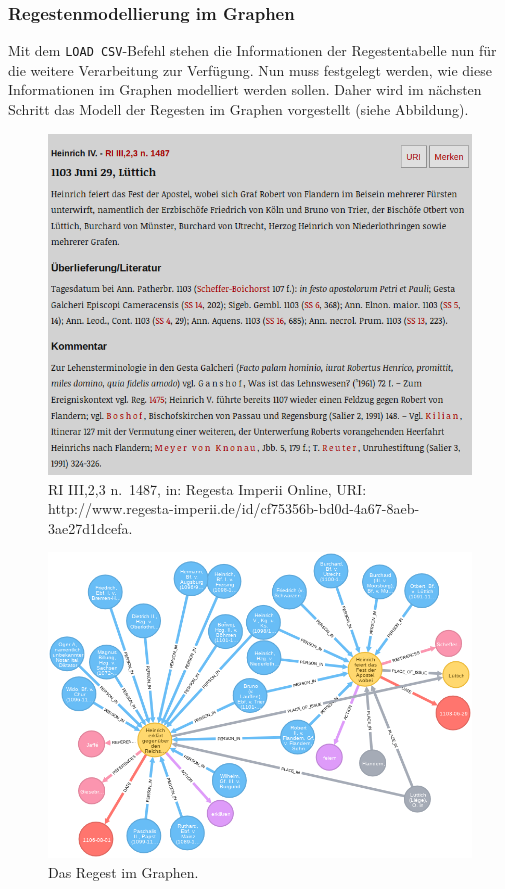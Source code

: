 \hypertarget{regestenmodellierung-im-graphen-1}{%
\subsubsection{Regestenmodellierung im
Graphen}\label{regestenmodellierung-im-graphen-1}}

Mit dem \texttt{LOAD\ CSV}-Befehl stehen die Informationen der
Regestentabelle nun für die weitere Verarbeitung zur Verfügung. Nun muss
festgelegt werden, wie diese Informationen im Graphen modelliert werden
sollen. Daher wird im nächsten Schritt das Modell der Regesten im
Graphen vorgestellt (siehe Abbildung).

\begin{figure}
\centering
\includegraphics{Bilder/RI2Graph/ReggH4-Nr-1487.png}
\caption{RI III,2,3 n.~1487, in: Regesta Imperii Online, URI:
http://www.regesta-imperii.de/id/cf75356b-bd0d-4a67-8aeb-3ae27d1dcefa.}
\end{figure}

\begin{figure}
\centering
\includegraphics{Bilder/RI2Graph/ReggH4-Nr-1487imGraph.png}
\caption{Das Regest im Graphen.}
\end{figure}

